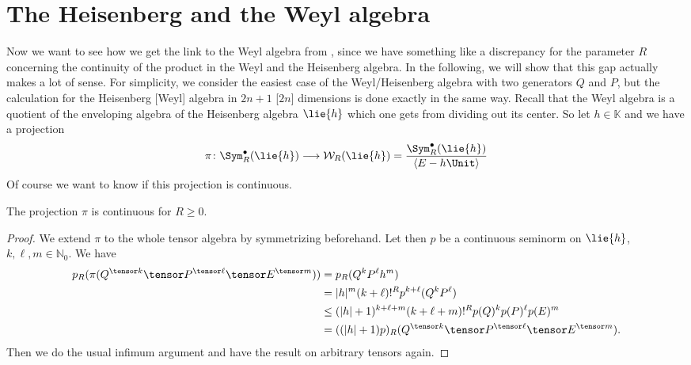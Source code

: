 \section{The Heisenberg and the Weyl algebra}
\label{sec:chap6_HeisenbergWeyl}

Now we want to see how we get the link to the Weyl algebra from
\cite{waldmann:2014a}, since we have something like a discrepancy for the
parameter $R$ concerning the continuity of the product in the Weyl and the 
Heisenberg algebra. In the following, we will show that this gap actually makes 
a lot of sense. For simplicity, we consider the easiest case of
the Weyl/Heisenberg algebra with two generators $Q$ and $P$, but the 
calculation for the Heisenberg [Weyl] algebra in $2n + 1$ [$2n$] dimensions 
is done exactly in the same way.
Recall that the Weyl algebra is a quotient of the enveloping algebra of the 
Heisenberg algebra $\lie{h}$ which one gets from dividing out its center. So 
let $h \in \mathbb{K}$ and we have a projection
\begin{equation}
    \label{Nilpot:WeylProjection}
    \pi \colon
    \Sym_R^\bullet(\lie{h})
    \longrightarrow
    \mathcal{W}_R(\lie{h})
    =
    \frac{\Sym_R^\bullet(\lie{h})}
    {\langle E - h \Unit \rangle}
\end{equation}
Of course we want to know if this projection is continuous.
\begin{proposition}
    \label{proposition:ProjectionWeylContinuous}%
    The projection $\pi$ is continuous for $R \geq 0$.
\end{proposition}
\begin{proof}
    We extend $\pi$ to the whole tensor algebra by symmetrizing
    beforehand. Let then $p$ be a continuous seminorm on $\lie{h}$, $k,
    \ell, m \in \mathbb{N}_0$. We have
    \begin{align*}
        p_R(\pi (
        	Q^{\tensor k} \tensor
        	P^{\tensor \ell} \tensor
        	E^{\tensor m}
        ) )
        & =
        p_R( Q^k P^{\ell} h^m )
        \\
        & =
        |h|^m (k + \ell)!^R
        p^{k + \ell}(Q^k P^{\ell})
        \\
        & \leq
        (|h| + 1)^{k + \ell + m}
        (k + \ell + m)!^R
        p(Q)^k p(P)^{\ell} p(E)^m
        \\
        & =
        ((|h| + 1) p)_R
        (Q^{\tensor k} \tensor
        P^{\tensor \ell} \tensor
        E^{\tensor m}).
    \end{align*}
    Then we do the usual infimum argument and have the result on
    arbitrary tensors again.
\end{proof}


